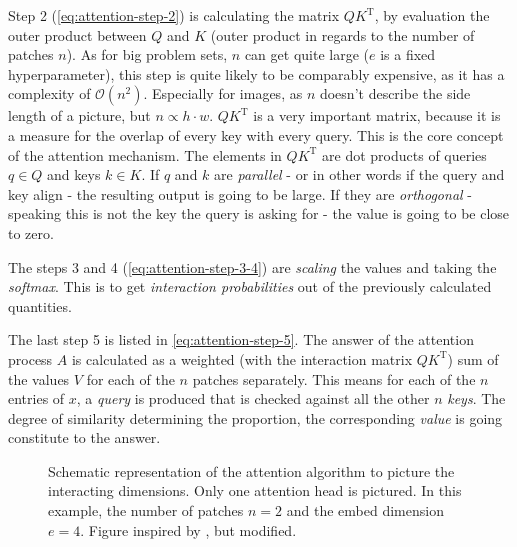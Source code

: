 Step 2 (\autoref{eq:attention-step-2}) is calculating the matrix $QK^\mathrm{T}$, by evaluation the \glqq outer product\grqq{} between $Q$ and $K$ (outer product in regards to the number of patches $n$).
As for big problem sets, $n$ can get quite large ($e$ is a fixed hyperparameter), this step is quite likely to be comparably expensive, as it has a complexity of $\mathcal{O}(n^2)$.
Especially for images, as $n$ doesn't describe the side length of a picture, but $n \propto h \cdot w$.
$QK^\mathrm{T}$ is a very important matrix, because it is a measure for the \glqq overlap\grqq{} of every key with every query. 
This is the core concept of the attention mechanism. 
The elements in $QK^\mathrm{T}$ are dot products of queries $q \in Q$ and keys $k \in K$. If $q$ and $k$ are \emph{parallel} - or in other words if the query and key align - the resulting output is going to be large.
If they are \emph{orthogonal} - speaking this is not the key the query is asking for - the value is going to be close to zero.

The steps 3 and 4 (\autoref{eq:attention-step-3-4}) are \emph{scaling} the values and taking the \emph{softmax}. 
This is to get \emph{interaction probabilities} out of the previously calculated quantities.

The last step 5 is listed in \autoref{eq:attention-step-5}.
The answer of the attention process $A$ is calculated as a weighted (with the interaction matrix $QK^\mathrm{T}$) sum of the values $V$ for each of the $n$ patches separately. 
This means for each of the $n$ entries of $x$, a \emph{query} is produced that is checked against all the other $n$ \emph{keys}. 
The degree of similarity determining the proportion, the corresponding \emph{value} is going constitute to the answer.

\begin{figure}[htbp]
    \centering
    \caption{Schematic representation of the attention algorithm to picture the interacting dimensions.
            Only one attention head is pictured.
            In this example, the number of patches $n=2$ and the embed dimension $e=4$.
            Figure inspired by \cite{attentionVisualizationDimensionality}, but modified.
            }
    \label{fig:attention-visualization}
\end{figure}

